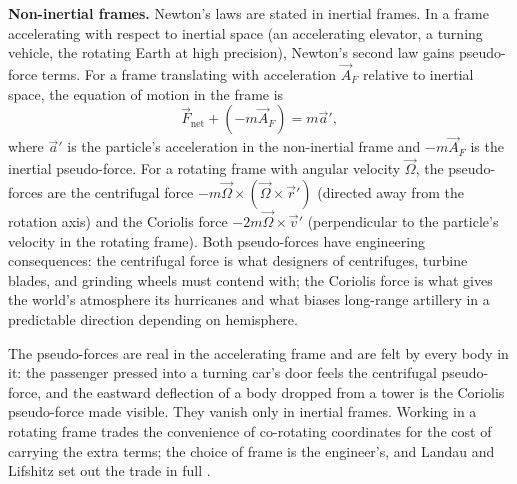 \begin{mastery}
\textbf{Non-inertial frames.} Newton's laws are stated in inertial
frames. In a frame accelerating with respect to inertial space (an
accelerating elevator, a turning vehicle, the rotating Earth at high
precision), Newton's second law gains pseudo-force terms. For a frame
translating with acceleration $\vec{A}_F$ relative to inertial space,
the equation of motion in the frame is
\[
\vec{F}_{\text{net}} + (-m\vec{A}_F) = m\vec{a}',
\]
where $\vec{a}'$ is the particle's acceleration in the non-inertial
frame and $-m\vec{A}_F$ is the inertial pseudo-force. For a rotating
frame with angular velocity $\vec{\Omega}$, the pseudo-forces are the
centrifugal force $-m\vec{\Omega} \times (\vec{\Omega} \times \vec{r}')$
(directed away from the rotation axis) and the Coriolis force
$-2m\vec{\Omega} \times \vec{v}'$ (perpendicular to the particle's
velocity in the rotating frame). Both pseudo-forces have engineering
consequences: the centrifugal force is what designers of centrifuges,
turbine blades, and grinding wheels must contend with; the Coriolis
force is what gives the world's atmosphere its hurricanes and what
biases long-range artillery in a predictable direction depending on
hemisphere.

The pseudo-forces are real in the accelerating frame and are felt by
every body in it: the passenger pressed into a turning car's door
feels the centrifugal pseudo-force, and the eastward deflection of a
body dropped from a tower is the Coriolis pseudo-force made visible.
They vanish only in inertial frames. Working in a rotating frame
trades the convenience of co-rotating coordinates for the cost of
carrying the extra terms; the choice of frame is the engineer's, and
Landau and Lifshitz set out the trade in full
\cite[\S{}39]{text:landau-mechanics}.
\end{mastery}

